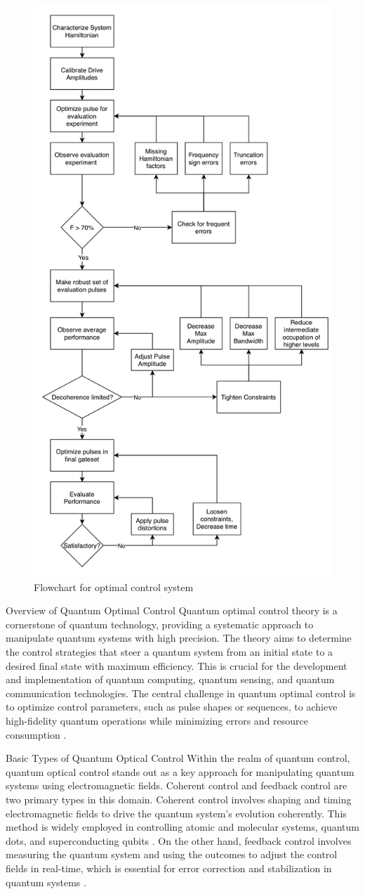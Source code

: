 \documentclass{article}
\begin{document}
\begin{figure}[H]
    \centering
    \includegraphics[width=0.6\linewidth]{flowchart.png}
    \caption{Flowchart for optimal control system}
    \label{fig:flowchart}
\end{figure}

Overview of Quantum Optimal Control
Quantum optimal control theory is a cornerstone of quantum technology, providing a systematic approach to manipulate quantum systems with high precision. The theory aims to determine the control strategies that steer a quantum system from an initial state to a desired final state with maximum efficiency. This is crucial for the development and implementation of quantum computing, quantum sensing, and quantum communication technologies. The central challenge in quantum optimal control is to optimize control parameters, such as pulse shapes or sequences, to achieve high-fidelity quantum operations while minimizing errors and resource consumption \cite{glaser2015, brif2010}.

Basic Types of Quantum Optical Control
Within the realm of quantum control, quantum optical control stands out as a key approach for manipulating quantum systems using electromagnetic fields. Coherent control and feedback control are two primary types in this domain. Coherent control involves shaping and timing electromagnetic fields to drive the quantum system's evolution coherently. This method is widely employed in controlling atomic and molecular systems, quantum dots, and superconducting qubits \cite{shapiro2012, chow2010}. On the other hand, feedback control involves measuring the quantum system and using the outcomes to adjust the control fields in real-time, which is essential for error correction and stabilization in quantum systems \cite{wiseman2009}.
\end{document}
